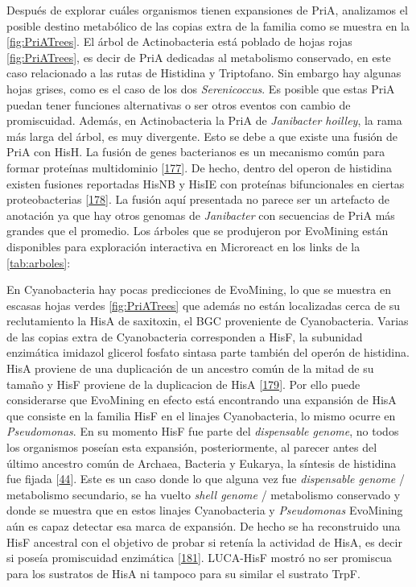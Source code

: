\documentclass[12pt,twoside]{reedthesis}
\begin{document}
  Después de explorar cuáles organismos tienen expansiones de PriA,
  analizamos el posible destino metabólico de las copias extra de la
  familia como se muestra en la \autoref{fig:PriATrees}. El árbol de
  Actinobacteria está poblado de hojas rojas \autoref{fig:PriATrees}, es
  decir de PriA dedicadas al metabolismo conservado, en este caso
  relacionado a las rutas de Histidina y Triptofano. Sin embargo hay
  algunas hojas grises, como es el caso de los dos \emph{Serenicoccus}. Es
  posible que estas PriA puedan tener funciones alternativas o ser otros
  eventos con cambio de promiscuidad. Además, en Actinobacteria la PriA de
  \emph{Janibacter hoilley}, la rama más larga del árbol, es muy
  divergente. Esto se debe a que existe una fusión de PriA con HisH. La
  fusión de genes bacterianos es un mecanismo común para formar proteínas
  multidominio {[}\protect\hyperlink{ref-pasek_gene_2006}{177}{]}. De
  hecho, dentro del operon de histidina existen fusiones reportadas HisNB
  y HisIE con proteínas bifuncionales en ciertas proteobacterias
  {[}\protect\hyperlink{ref-fani_origin_2005}{178}{]}. La fusión aquí
  presentada no parece ser un artefacto de anotación ya que hay otros
  genomas de \emph{Janibacter} con secuencias de PriA más grandes que el
  promedio. Los árboles que se produjeron por EvoMining están disponibles
  para exploración interactiva en Microreact en los links de la
  \autoref{tab:arboles}:
  
  En Cyanobacteria hay pocas predicciones de EvoMining, lo que se muestra
  en escasas hojas verdes \autoref{fig:PriATrees} que además no están
  localizadas cerca de su reclutamiento la HisA de saxitoxin, el BGC
  proveniente de Cyanobacteria. Varias de las copias extra de
  Cyanobacteria corresponden a HisF, la subunidad enzimática imidazol
  glicerol fosfato sintasa parte también del operón de histidina. HisA
  proviene de una duplicación de un ancestro común de la mitad de su
  tamaño y HisF proviene de la duplicacion de HisA
  {[}\protect\hyperlink{ref-fani_evolution_1994}{179}{]}. Por ello puede
  considerarse que EvoMining en efecto está encontrando una expansión de
  HisA que consiste en la familia HisF en el linajes Cyanobacteria, lo
  mismo ocurre en \emph{Pseudomonas}. En su momento HisF fue parte del
  \emph{dispensable genome}, no todos los organismos poseían esta
  expansión, posteriormente, al parecer antes del último ancestro común de
  Archaea, Bacteria y Eukarya, la síntesis de histidina fue fijada
  {[}\protect\hyperlink{ref-fondi_evolution_2009}{44}{]}. Este es un caso
  donde lo que alguna vez fue \emph{dispensable genome} / metabolismo
  secundario, se ha vuelto \emph{shell genome} / metabolismo conservado y
  donde se muestra que en estos linajes Cyanobacteria y \emph{Pseudomonas}
  EvoMining aún es capaz detectar esa marca de expansión. De hecho se ha
  reconstruido una HisF ancestral con el objetivo de probar si retenía la
  actividad de HisA, es decir si poseía promiscuidad enzimática
  {[}\protect\hyperlink{ref-merkl_reconstruction_2016}{181}{]}. LUCA-HisF
  mostró no ser promiscua para los sustratos de HisA ni tampoco para su
  similar el sustrato TrpF.
  
\end{document}
